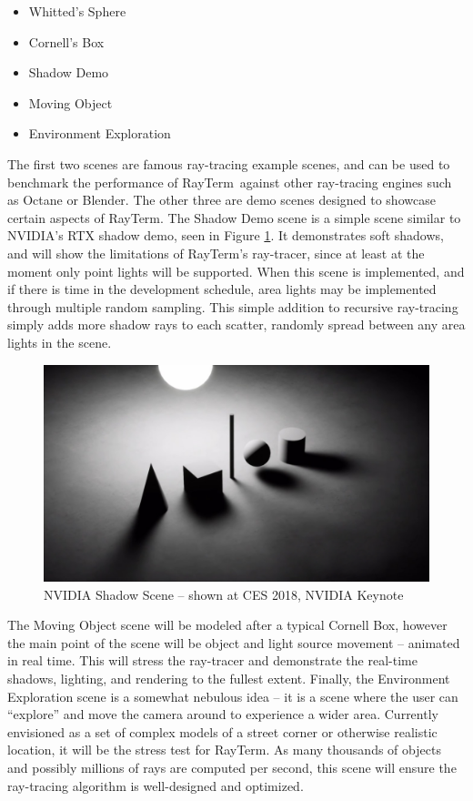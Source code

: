 \documentclass[11pt]{article}
\newcommand{\name}{{\sc RayTerm}}
\begin{document}
\begin{itemize}
  \setlength\itemsep{-0.25em}
  \item Whitted's Sphere
  \item Cornell's Box
  \item Shadow Demo
  \item Moving Object
  \item Environment Exploration
\end{itemize}

The first two scenes are famous ray-tracing example scenes, and can be used to benchmark the performance of \name\ against other ray-tracing engines such as Octane or Blender.
The other three are demo scenes designed to showcase certain aspects of \name.
The Shadow Demo scene is a simple scene similar to NVIDIA's RTX shadow demo, seen in Figure \ref{fig:nvidia_shadows}.
It demonstrates soft shadows, and will show the limitations of \name's ray-tracer, since at least at the moment only point lights will be supported.
When this scene is implemented, and if there is time in the development schedule, area lights may be implemented through multiple random sampling.
This simple addition to recursive ray-tracing simply adds more shadow rays to each scatter, randomly spread between any area lights in the scene.

\begin{figure}[htb]
  \centering
  \includegraphics[width=\textwidth]{resources/nvidia_shadows}
  \caption{NVIDIA Shadow Scene -- shown at CES 2018, NVIDIA Keynote}
  \label{fig:nvidia_shadows}
\end{figure}

The Moving Object scene will be modeled after a typical Cornell Box, however the main point of the scene will be object and light source movement -- animated in real time.
This will stress the ray-tracer and demonstrate the real-time shadows, lighting, and rendering to the fullest extent.
Finally, the Environment Exploration scene is a somewhat nebulous idea -- it is a scene where the user can ``explore'' and move the camera around to experience a wider area.
Currently envisioned as a set of complex models of a street corner or otherwise realistic location, it will be the stress test for \name.
As many thousands of objects and possibly millions of rays are computed per second, this scene will ensure the ray-tracing algorithm is well-designed and optimized.
\end{document}
